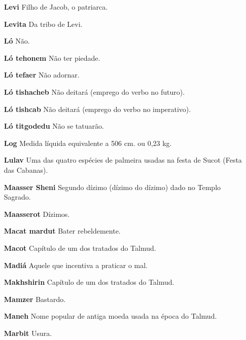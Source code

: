 \begin{itemize}
\item[\textbf{Levi}] Filho de Jacob, o patriarca.

\item[\textbf{Levita}] Da tribo de Levi.

\item[\textbf{Ló}] Não.

\item[\textbf{Ló tehonem}] Não ter piedade.

\item[\textbf{Ló tefaer}] Não adornar.

\item[\textbf{Ló tishacheb}] Não deitará (emprego do verbo no futuro).

\item[\textbf{Ló tishcab}] Não deitará (emprego do verbo no imperativo).

\item[\textbf{Ló titgodedu}] Não se tatuarão.

\item[\textbf{Log}] Medida líquida equivalente a 506 cm. ou 0,23 kg.

\item[\textbf{Lulav}] Uma das quatro espécies de palmeira usadas na festa de
Sucot (Festa das Cabanas).

\item[\textbf{Maasser Sheni}] Segundo dízimo (dízi­mo do dízimo) dado no
Templo Sagrado.

\item[\textbf{Maasserot}] Dízimos.

\item[\textbf{Macat mardut}] Bater rebeldemente.

\item[\textbf{Macot}] Capítulo de um dos tratados do Talmud.

\item[\textbf{Madiá}] Aquele que incentiva a prati­car o mal.

\item[\textbf{Makhshirin}] Capítulo de um dos tra­tados do Talmud.

\item[\textbf{Mamzer}] Bastardo.

\item[\textbf{Maneh}] Nome popular de antiga moe­da usada na época do Talmud.

\item[\textbf{Marbit}] Usura.


\end{itemize}
